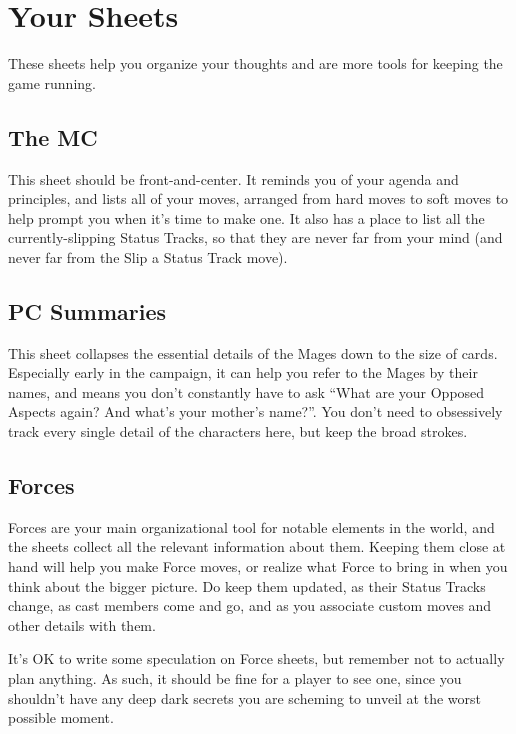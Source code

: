 \documentclass[
  oneside,
  statementpaper,
  9pt]{memoir}
\begin{document}
\hypertarget{your-sheets}{%
\section{Your Sheets}\label{your-sheets}}

These sheets help you organize your thoughts and are more tools for
keeping the game running.

\hypertarget{the-mc}{%
\subsection{The MC}\label{the-mc}}

This sheet should be front-and-center. It reminds you of your agenda and
principles, and lists all of your moves, arranged from hard moves to
soft moves to help prompt you when it's time to make one. It also has a
place to list all the currently-slipping Status Tracks, so that they are
never far from your mind (and never far from the Slip a Status Track
move).

\hypertarget{pc-summaries}{%
\subsection{PC Summaries}\label{pc-summaries}}

This sheet collapses the essential details of the Mages down to the size
of cards. Especially early in the campaign, it can help you refer to the
Mages by their names, and means you don't constantly have to ask ``What
are your Opposed Aspects again? And what's your mother's name?''. You
don't need to obsessively track every single detail of the characters
here, but keep the broad strokes.

\hypertarget{forces}{%
\subsection{Forces}\label{forces}}

Forces are your main organizational tool for notable elements in the
world, and the sheets collect all the relevant information about them.
Keeping them close at hand will help you make Force moves, or realize
what Force to bring in when you think about the bigger picture. Do keep
them updated, as their Status Tracks change, as cast members come and
go, and as you associate custom moves and other details with them.

It's OK to write some speculation on Force sheets, but remember not to
actually plan anything. As such, it should be fine for a player to see
one, since you shouldn't have any deep dark secrets you are scheming to
unveil at the worst possible moment.
\end{document}
